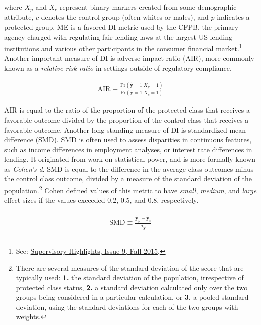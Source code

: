 \documentclass[information,article,submit,moreauthors,pdftex]{definitions/mdpi}
\begin{document}
\noindent where $X_p$ and $X_c$ represent binary markers created from some demographic attribute, $c$ denotes the control group (often whites or males), and $p$ indicates a protected group.  ME is a favored DI metric used by the CFPB, the primary agency charged with regulating fair lending laws at the largest US lending institutions and various other participants in the consumer financial market.\footnote{See: \href{https://files.consumerfinance.gov/f/201510_cfpb_supervisory-highlights.pdf}{Supervisory Highlights, Issue 9, Fall 2015}.} Another important measure of DI is adverse impact ratio (AIR), more commonly known as a \textit{relative risk ratio} in settings outside of regulatory compliance.

\begin{equation}
\label{eq:air}
\begin{aligned}
\text{AIR} \equiv \frac{\text{Pr}(\hat{\mathbf{y}} = 1 | X_p = 1)}{\text{Pr}(\hat{\mathbf{y}} = 1| X_c = 1)}
\end{aligned}
\end{equation}

\noindent AIR is equal to the ratio of the proportion of the protected class that receives a favorable outcome divided by the proportion of the control class that receives a favorable outcome.  Another long-standing measure of DI is standardized mean difference (SMD). SMD is often used to assess disparities in continuous features, such as income differences in employment analyses, or interest rate differences in lending. It originated from work on statistical power, and is more formally known as \textit{Cohen’s d}. SMD is equal to the difference in the average class outcomes minus the control class outcome, divided by a measure of the standard deviation of the population.\footnote{There are several measures of the standard deviation of the score that are typically used: \textbf{1.} the standard deviation of the population, irrespective of protected class status, \textbf{2.} a standard deviation calculated only over the two groups being considered in a particular calculation, or \textbf{3.} a pooled standard deviation, using the standard deviations for each of the two groups with weights.} Cohen defined values of this metric to have \textit{small}, \textit{medium}, and \textit{large} effect sizes if the values exceeded 0.2, 0.5, and 0.8, respectively.  

\begin{equation}
\label{eq:smd}
\begin{aligned}
\text{SMD} \equiv \frac{\bar{\hat{\mathbf{y}}}_p - \bar{\hat{\mathbf{y}}}_c}{ \sigma_{\hat{\mathbf{y}}}}
\end{aligned}
\end{equation}
\end{document}
